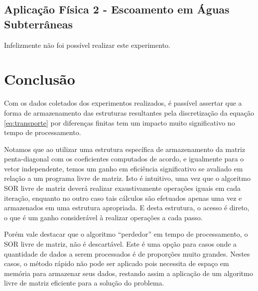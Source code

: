 \documentclass[
	11pt,				%
	oneside,			%
	a4paper,			%
	english,			%
	brazil,				%
	]{article}
\begin{document}
\subsection{Aplicação Física 2 - Escoamento em Águas Subterrâneas}
Infelizmente não foi possível realizar este experimento.

\section{Conclusão}
Com os dados coletados dos experimentos realizados, é passível assertar que a 
forma de armazenamento das estruturas resultantes pela discretização da equação 
\eqref{eq:transporte} por diferenças finitas tem um impacto muito significativo 
no tempo de processamento.

Notamos que ao utilizar uma estrutura específica de armazenamento da matriz 
penta-diagonal com os coeficientes computados de acordo, e igualmente para o 
vetor independente, temos um ganho em eficiência significativo se avaliado em 
relação a um programa livre de matriz. Isto é intuitivo, uma vez que o 
algoritmo SOR livre de matriz deverá realizar exaustivamente operações iguais 
em cada iteração, enquanto no outro caso tais cálculos são efetuados apenas 
uma vez e armazenados em uma estrutura apropriada. E desta estrutura, o acesso 
é direto, o que é um ganho considerável à realizar operações a cada passo.

Porém vale destacar que o algoritmo ``perdedor'' em tempo de processamento, o 
SOR livre de matriz, não é descartável. Este é uma opção para casos onde a 
quantidade de dados a serem processados é de proporções muito grandes. Nestes 
casos, o método rápido não pode ser aplicado pois necessita de espaço em 
memória para armazenar seus dados, restando assim a aplicação de um algoritmo 
livre de matriz eficiente para a solução do problema.
\end{document}
